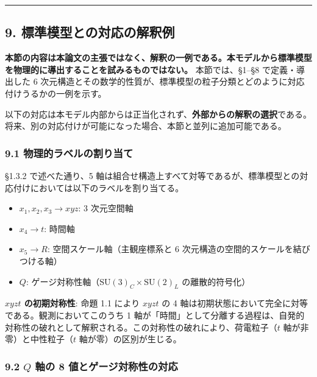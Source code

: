 \documentclass[
  a4paper,11pt]{ltjsarticle}
\providecommand{\tightlist}{%
  \setlength{\itemsep}{0pt}\setlength{\parskip}{0pt}}
\theoremstyle{definition}
\theoremstyle{remark}
\begin{document}
\begin{center}\rule{0.5\linewidth}{0.5pt}\end{center}

\subsection{9.
標準模型との対応の解釈例}\label{ux6a19ux6e96ux6a21ux578bux3068ux306eux5bfeux5fdcux306eux89e3ux91c8ux4f8b}

\textbf{本節の内容は本論文の主張ではなく、解釈の一例である。本モデルから標準模型を物理的に導出することを試みるものではない。}
本節では、§1--§8 で定義・導出した 6
次元構造とその数学的性質が、標準模型の粒子分類とどのように対応付けうるかの一例を示す。

以下の対応は本モデル内部からは正当化されず、\textbf{外部からの解釈の選択}である。将来、別の対応付けが可能になった場合、本節と並列に追加可能である。

\subsubsection{9.1
物理的ラベルの割り当て}\label{ux7269ux7406ux7684ux30e9ux30d9ux30ebux306eux5272ux308aux5f53ux3066}

§1.3.2 で述べた通り、5
軸は組合せ構造上すべて対等であるが、標準模型との対応付けにおいては以下のラベルを割り当てる。

\begin{itemize}
\tightlist
\item
  \(x_1, x_2, x_3 \to xyz\): 3 次元空間軸
\item
  \(x_4 \to t\): 時間軸
\item
  \(x_5 \to R\): 空間スケール軸（主観座標系と 6
  次元構造の空間的スケールを結びつける軸）
\item
  \(Q\): ゲージ対称性軸（\(\mathrm{SU}(3)_C \times \mathrm{SU}(2)_L\)
  の離散的符号化）
\end{itemize}

\textbf{\(xyzt\) の初期対称性}: 命題 1.1 により \(xyzt\) の 4
軸は初期状態において完全に対等である。観測においてこのうち 1
軸が「時間」として分離する過程は、自発的対称性の破れとして解釈される。この対称性の破れにより、荷電粒子（\(t\)
軸が非零）と中性粒子（\(t\) 軸が零）の区別が生じる。

\subsubsection{\texorpdfstring{9.2 \(Q\) 軸の 8
値とゲージ対称性の対応}{9.2 Q 軸の 8 値とゲージ対称性の対応}}\label{q-ux8ef8ux306e-8-ux5024ux3068ux30b2ux30fcux30b8ux5bfeux79f0ux6027ux306eux5bfeux5fdc}
\end{document}
